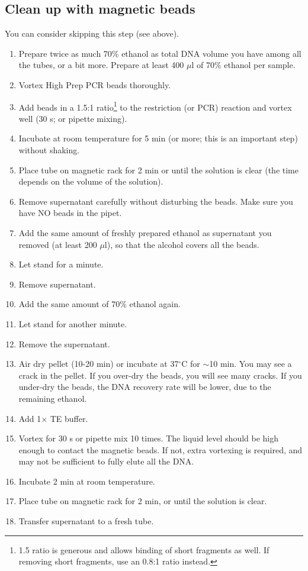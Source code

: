 \documentclass[a4paper,12pt]{article}
\begin{document}
\subsection{Clean up with magnetic beads}
You can consider skipping this step (see above).
\begin{enumerate}
\item Prepare twice as much 70\% ethanol as total DNA volume you have among all the tubes, or a bit more. Prepare at least 400 $\mu$l of 70\% ethanol per sample.
\item Vortex High Prep PCR beads thoroughly.
\item Add beads in a 1.5:1 ratio\footnote{1.5 ratio is generous and allows binding of short fragments as well. If removing short fragments, use an 0.8:1 ratio instead.} to the restriction (or PCR) reaction and vortex well (30 s; or pipette mixing).
\item Incubate at room temperature for 5 min (or more; this is an important step) without shaking.
\item Place tube on magnetic rack for 2 min or until the solution is clear (the time depends on the volume of the solution).
\item Remove supernatant carefully without disturbing the beads. Make sure you have NO beads in the pipet.
\item Add the same amount of freshly prepared ethanol as supernatant you removed (at least 200 $\mu$l), so that the alcohol covers all the beads.
\item Let stand for a minute.
\item Remove supernatant.
\item Add the same amount of 70\% ethanol again.
\item Let stand for another minute.
\item Remove the supernatant.
\item Air dry pellet (10-20 min) or incubate at 37$^{\circ}$C for $\sim$10 min. You may see a crack in the pellet. If you over-dry the beads, you will see many cracks. If you under-dry the beads, the DNA recovery rate will be lower, due to the remaining ethanol. 
\item Add 1$\times$ TE buffer.
\item Vortex for 30 s or pipette mix 10 times. The liquid level should be high enough to contact the magnetic beads. If not, extra vortexing is required, and may not be sufficient to fully elute all the DNA.
\item Incubate 2 min at room temperature.
\item Place tube on magnetic rack for 2 min, or until the solution is clear.
\item Transfer supernatant to a fresh tube.
\end{enumerate}
\end{document}
